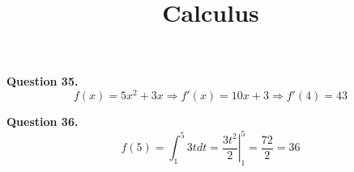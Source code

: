 \documentclass{ximera}
\title{Calculus}
\begin{document}
\maketitle

\textbf{Question 35.} 
\begin{equation*}
f(x) = 5x^2 + 3x \Rightarrow f'(x) = 10 x + 3 \Rightarrow f'(4) = 43
\end{equation*}

\textbf{Question 36.}
\begin{equation*}
f(5) = \int_1^5 3t dt = \left. \frac{3t^2}{2} \right|_1^5 = \frac{72}{2} = 36
\end{equation*}
\end{document}
